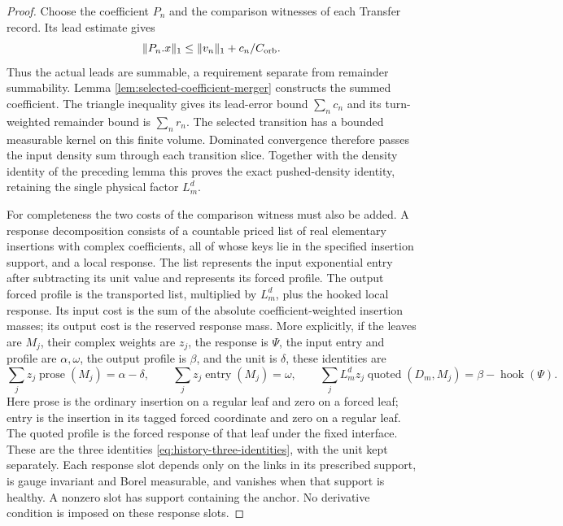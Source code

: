\begin{proof}
Choose the coefficient $P_n$ and the comparison witnesses of each
Transfer record. Its lead estimate gives
\[
 \|P_n.x\|_1\le\|v_n\|_1+c_n/C_{\rm orb}.
\]
Thus the actual leads are summable, a requirement separate from
remainder summability. Lemma \ref{lem:selected-coefficient-merger}
constructs the summed coefficient. The triangle inequality gives its
lead-error bound $\sum_n c_n$ and its turn-weighted remainder bound
is $\sum_n r_n$. The selected transition has a bounded measurable
kernel on this finite volume. Dominated convergence therefore passes
the input density sum through each transition slice. Together with
the density identity of the preceding lemma this proves the exact
pushed-density identity, retaining the single physical factor $L_m^d$.

For completeness the two costs of the comparison witness must also
be added. A response decomposition consists of a countable priced list of real elementary
insertions with complex coefficients, all of whose keys lie in the
specified insertion support, and a local response. The list represents the input
exponential entry after subtracting its unit value and represents its
forced profile. The output forced profile is the transported list,
multiplied by $L_m^d$, plus the hooked local response. Its input cost
is the sum of the absolute coefficient-weighted insertion masses;
its output cost is the reserved response mass. More explicitly, if the leaves are $M_j$, their complex weights are
$z_j$, the response is $\Psi$, the input entry and profile are
$\alpha,\omega$, the output profile is $\beta$, and the unit is $\delta$,
these identities are
\[
 \sum_j z_j\operatorname{prose}(M_j)=\alpha-\delta,\qquad
 \sum_j z_j\operatorname{entry}(M_j)=\omega,\qquad
 \sum_j L_m^dz_j\operatorname{quoted}(D_m,M_j)
       =\beta-\operatorname{hook}(\Psi).
\]
Here prose is the ordinary insertion on a regular leaf and zero on a
forced leaf; entry is the insertion in its tagged forced coordinate
and zero on a regular leaf. The quoted profile is the forced response
of that leaf under the fixed interface. These are the three identities
\eqref{eq:history-three-identities}, with the unit kept separately. Each response slot depends only on the links in its prescribed
support, is gauge invariant and Borel measurable, and vanishes when
that support is healthy. A nonzero slot has support containing the
anchor. No derivative condition is imposed on these response slots.


\end{proof}
